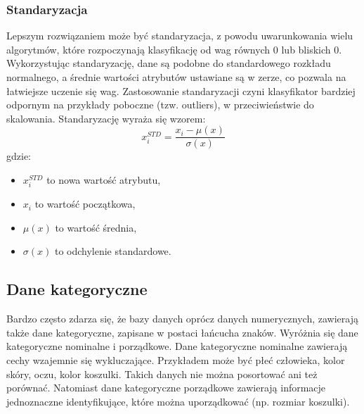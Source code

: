 \subsubsection{Standaryzacja}
Lepszym rozwiązaniem może być standaryzacja, z powodu uwarunkowania wielu algorytmów, które rozpoczynają klasyfikację od wag równych 0 lub bliskich 0. Wykorzystując standaryzację, dane są podobne do standardowego rozkładu normalnego, a średnie wartości atrybutów ustawiane są w zerze, co pozwala na łatwiejsze uczenie się wag. Zastosowanie standaryzacji czyni klasyfikator bardziej odpornym na przykłady poboczne (tzw. outliers), w przeciwieństwie do skalowania. Standaryzację wyraża się wzorem:
\[x_i^{STD} = \frac{x_i - \mu(x)}{\sigma(x)}\]
gdzie:
\begin{itemize}
	\item $x_i^{STD}$ to nowa wartość atrybutu,
	\item $x_i$ to wartość początkowa,
	\item $\mu(x)$ to wartość średnia,
	\item $\sigma(x)$ to odchylenie standardowe.
\end{itemize}
\subsection{Dane kategoryczne}
Bardzo często zdarza się, że bazy danych oprócz danych numerycznych, zawierają także dane kategoryczne, zapisane w postaci łańcucha znaków. Wyróżnia się dane kategoryczne nominalne i porządkowe. Dane kategoryczne nominalne zawierają cechy wzajemnie się wykluczające. Przykładem może być płeć człowieka, kolor skóry, oczu, kolor koszulki. Takich danych nie można posortować ani też porównać. Natomiast dane kategoryczne porządkowe zawierają informacje jednoznaczne identyfikujące, które można uporządkować (np. rozmiar koszulki).
